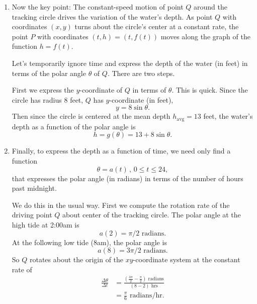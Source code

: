 \documentclass{ximera}
\begin{document}
\begin{example}
\begin{enumerate}
Activate the folders \emph{Uniform circular motion} and \emph{Polar angle} on Lines 21 and 30 to see the circle and coordinate system.

\item Now the key point: The constant-speed motion of point $Q$ around the tracking circle drives the variation of the water's depth. As point $Q$ with coordinates $(x,y)$ turns about the circle's center at a constant rate, the point $P$ with coordinates $(t,h) = (t,f(t))$ moves along the graph of the function $h=f(t)$.

Let's temporarily ignore time and express the depth of the water (in feet) in terms of the polar angle $\theta$ of $Q$. There are two steps.

First we express the $y$-coordinate of $Q$ in terms of $\theta$. This is quick. Since the circle has radius $8$ feet, $Q$ has $y$-coordinate (in feet),
\[
     y = 8\sin\theta .
\]
Then since the circle is centered at the mean depth $h_{\text{avg}}=13$ feet, the water's depth as a function of the polar angle is
\[
     h =g(\theta) = 13 +  8\sin\theta . 
\]

\item Finally, to express the depth as a function of time, we need only find a function
\[
     \theta = a(t) \, , \, 0\leq t \leq 24,
\]
that expresses the polar angle (in radians) in terms of the number of hours past midnight.

We do this in the usual way.  First we compute the rotation rate of the driving point $Q$ about center of the tracking circle. The polar angle at the high tide at 2:00am is
\[
   a(2) = \pi/2 \text{ radians}.
\]
At the following low tide (8am), the polar angle is
\[
  a(8) = 3\pi/2 \text{ radians}.
\]
So $Q$ rotates about the origin of the $xy$-coordinate system at the constant rate of
\begin{align*}
    \frac{\Delta \theta}{\Delta t} &= \frac{\left( \frac{3\pi}{2} - \frac{\pi}{2}\right)\text{ radians}}{(8-2)\text{ hrs}} \\
                                              &= \frac{\pi}{6} \text{ radians/hr}.
\end{align*}


\end{enumerate}
\end{example}
\end{document}
